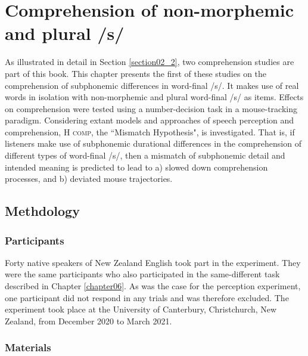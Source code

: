 \chapter{Comprehension of non-morphemic and plural /s/}\label{chapter07}

As illustrated in detail in Section \ref{section02_2}, two comprehension studies are part of this book. This chapter presents the first of these studies on the comprehension of subphonemic differences in word-final /s/. It makes use of real words in isolation with non-morphemic and plural word-final /s/ as items. Effects on comprehension were tested using a number-decision task in a mouse-tracking paradigm. Considering extant models and approaches of speech perception and comprehension, \textsc{H comp}, the ``Mismatch Hypothesis", is investigated. That is, if listeners make use of subphonemic durational differences in the comprehension of different types of word-final /s/, then a mismatch of subphonemic detail and intended meaning is predicted to lead to a) slowed down comprehension processes, and b) deviated mouse trajectories. 

\section{Methdology}\label{section07_1}

\subsection{Participants}\label{section07_1_1}

Forty native speakers of New Zealand English took part in the experiment. They were the same participants who also participated in the same-different task described in Chapter \ref{chapter06}. As was the case for the perception experiment, one participant did not respond in any trials and was therefore excluded. The experiment took place at the University of Canterbury, Christchurch, New Zealand, from December 2020 to March 2021.

\subsection{Materials}\label{section07_1_2}

